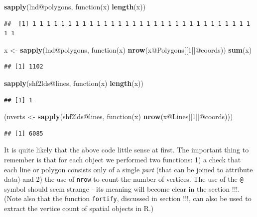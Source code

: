 \documentclass[]{article}
\newenvironment{Shaded}{}{}
\newcommand{\KeywordTok}[1]{\textcolor[rgb]{0.00,0.44,0.13}{\textbf{{#1}}}}
\newcommand{\DecValTok}[1]{\textcolor[rgb]{0.25,0.63,0.44}{{#1}}}
\newcommand{\NormalTok}[1]{{#1}}
\begin{document}
\begin{Shaded}
\begin{Highlighting}[]
\KeywordTok{sapply}\NormalTok{(lnd@polygons, function(x) }\KeywordTok{length}\NormalTok{(x))}
\end{Highlighting}
\end{Shaded}
\begin{verbatim}
##  [1] 1 1 1 1 1 1 1 1 1 1 1 1 1 1 1 1 1 1 1 1 1 1 1 1 1 1 1 1 1 1 1 1 1
\end{verbatim}
\begin{Shaded}
\begin{Highlighting}[]
\NormalTok{x <- }\KeywordTok{sapply}\NormalTok{(lnd@polygons, function(x) }\KeywordTok{nrow}\NormalTok{(x@Polygons[[}\DecValTok{1}\NormalTok{]]@coords))}
\KeywordTok{sum}\NormalTok{(x)}
\end{Highlighting}
\end{Shaded}
\begin{verbatim}
## [1] 1102
\end{verbatim}
\begin{Shaded}
\begin{Highlighting}[]

\KeywordTok{sapply}\NormalTok{(shf2lds@lines, function(x) }\KeywordTok{length}\NormalTok{(x))}
\end{Highlighting}
\end{Shaded}
\begin{verbatim}
## [1] 1
\end{verbatim}
\begin{Shaded}
\begin{Highlighting}[]
\NormalTok{(nverts <- }\KeywordTok{sapply}\NormalTok{(shf2lds@lines, function(x) }\KeywordTok{nrow}\NormalTok{(x@Lines[[}\DecValTok{1}\NormalTok{]]@coords)))}
\end{Highlighting}
\end{Shaded}
\begin{verbatim}
## [1] 6085
\end{verbatim}
It is quite likely that the above code little sense at first. The
important thing to remember is that for each object we performed two
functions: 1) a check that each line or polygon consists only of a
single \emph{part} (that can be joined to attribute data) and 2) the use
of \texttt{nrow} to count the number of vertices. The use of the
\texttt{@} symbol should seem strange - its meaning will become clear in
the section !!!. (Note also that the function \texttt{fortify},
discussed in section !!!, can also be used to extract the vertice count
of spatial objects in R.)
\end{document}
